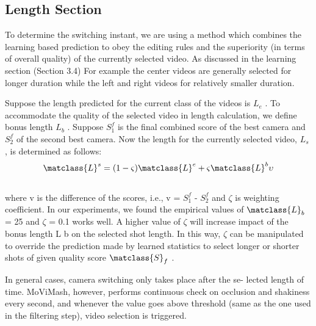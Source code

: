 \documentclass{sig-alternate}
\begin{document}
\subsection{Length Section}
To determine the switching instant, we are using a method which
combines the learning based prediction to obey the editing rules and
the superiority (in terms of overall quality) of the currently selected
video. As discussed in the learning section (Section 3.4) For example the
center videos are generally selected for longer duration while the
left and right videos for relatively smaller duration.

Suppose the length predicted for the current class of the videos
is $L_e$ . To accommodate the quality of the selected video in length
calculation, we define bonus length $L_b$ . Suppose $S^{f}_1$ is the final combined score of the best camera and $S^{f}_2$
of the second best camera. Now the length for the currently selected
video, $L_s$ , is determined as follows:
\begin{equation}
\matclass{L}^s = (1-\varsigma)\matclass{L}^e+\varsigma \matclass{L}^b\upsilon
\end{equation}
\\
where v is the difference of the scores, i.e., v = ${S^{f}_1}$ - ${S^{f}_2}$ and $\zeta$ is
weighting coefficient. In our experiments, we found the empirical
values of $\matclass{L}_b$ = 25 and $\zeta$ = 0.1 works well. A higher value of
$\zeta$ will increase impact of the bonus length L b on the selected shot
length. In this way, $\zeta$ can be manipulated to override the prediction
made by learned statistics to select longer or shorter shots of given
quality score $\matclass{S}_f$ .

In general cases, camera switching only takes place after the se-
lected length of time. MoViMash, however, performs continuous
check on occlusion and shakiness every second, and whenever the
value goes above threshold (same as the one used in the filtering
step), video selection is triggered.
\end{document}
